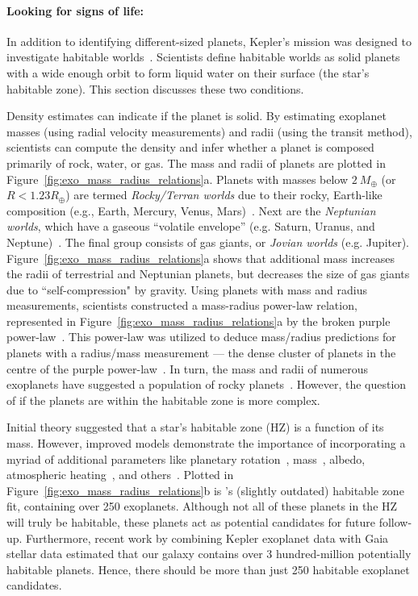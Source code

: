 \paragraph{Looking for signs of life:}
In addition to identifying different-sized planets, Kepler's mission was designed to investigate habitable worlds~\cite{kepler_mission}.
Scientists define habitable worlds as solid planets with a wide enough orbit to form liquid water on their surface (the star's habitable zone).
This section discusses these two conditions.

Density estimates can indicate if the planet is solid.
By estimating exoplanet masses (using radial velocity measurements) and radii (using the transit method), scientists can compute the density and infer whether a planet is composed primarily of rock, water, or gas.
The mass and radii of planets are plotted in Figure~\ref{fig:exo_mass_radius_relations}a. 
Planets with masses below $2\ M_{\oplus}$ (or $R < 1.23 R_{\oplus}$) are termed \textit{Rocky/Terran worlds} due to their rocky, Earth-like composition (e.g., Earth, Mercury, Venus, Mars)~\cite{Oppenheimer:2016:Sci}.
Next are the \textit{Neptunian worlds}, which have a gaseous ``volatile envelope'' (e.g. Saturn, Uranus, and Neptune)~\cite{Chen:2017:ApJ}.
The final group consists of gas giants, or \textit{Jovian worlds} (e.g. Jupiter).
Figure~\ref{fig:exo_mass_radius_relations}a shows that additional mass increases the radii of terrestrial and Neptunian planets, but decreases the size of gas giants due to ``self-compression" by gravity.
Using planets with mass and radius measurements, scientists constructed a mass-radius power-law relation, represented in Figure~\ref{fig:exo_mass_radius_relations}a by the broken purple power-law~\cite{Chen:2017:ApJ}.
This power-law was utilized to deduce mass/radius predictions for planets with a radius/mass measurement — the dense cluster of planets in the centre of the purple power-law~\cite{Chen:2017:ApJ}.
In turn, the mass and radii of numerous exoplanets have suggested a population of rocky planets~\cite{kepler_mission}.
However, the question of if the planets are within the habitable zone is more complex.


Initial theory suggested that a star's habitable zone (HZ) is a function of its mass. 
However, improved models demonstrate the importance of incorporating a myriad of additional parameters like planetary rotation~\cite{Yang:2014:ApJL},  mass~\cite{Kopparapu:2014:ApJL}, albedo, atmospheric heating~\cite{Kasting:2011:AsBio}, and others~\cite{Yang:2014:ApJL, Kopparapu:2013:ApJ, Kopparapu:2014:ApJL, Shields:2014:ApJL}. 
Plotted in Figure~\ref{fig:exo_mass_radius_relations}b is \citet{Kopparapu:2014:ApJL}'s (slightly outdated) habitable zone fit, containing over 250 exoplanets.
Although not all of these planets in the HZ will truly be habitable, these planets act as potential candidates for future follow-up. 
Furthermore, recent work by 
\citet{Bryson:2021:AJ} combining Kepler exoplanet data with Gaia stellar data estimated that our galaxy contains over 3 hundred-million potentially habitable planets.
Hence, there should be more than just 250 habitable exoplanet candidates.


